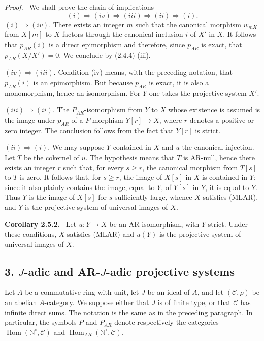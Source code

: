 \documentclass[11pt]{article}
\providecommand{\NN}{\mathbb{N}}
\newenvironment{statement}[1]{\par\medskip\noindent\textbf{#1.}\ }{\par\medskip}
\newenvironment{prooftext}[1][Proof]{\par\noindent\emph{#1.}\ }{\par\medskip}
\DeclareMathOperator{\Hom}{Hom}
\providecommand{\Hom}{\operatorname{Hom}}
\providecommand{\NN}{\mathbb N}
\providecommand{\cC}{\mathcal C}
\providecommand{\cC}{\mathcal C}
\providecommand{\Hom}{\operatorname{Hom}}
\begin{document}
\begin{prooftext}[Proof]
We shall prove the chain of implications
\[
(i)\Rightarrow(iv)\Rightarrow(iii)\Rightarrow(ii)\Rightarrow(i).
\]
$(i)\Rightarrow(iv)$. There exists an integer $m$ such that the canonical morphism $w_{mX}$ from $X[m]$ to $X$ factors through the canonical inclusion $i$ of $X'$ in $X$. It follows that $p_{AR}(i)$ is a direct epimorphism and therefore, since $p_{AR}$ is exact, that $p_{AR}(X/X')=0$. We conclude by (2.4.4) (iii).

$(iv)\Rightarrow(iii)$. Condition (iv) means, with the preceding notation, that $p_{AR}(i)$ is an epimorphism. But because $p_{AR}$ is exact, it is also a monomorphism, hence an isomorphism. For $Y$ one takes the projective system $X'$.

$(iii)\Rightarrow(ii)$. The $P_{AR}$-isomorphism from $Y$ to $X$ whose existence is assumed is the image under $p_{AR}$ of a $P$-morphism $Y[r]\to X$, where $r$ denotes a positive or zero integer. The conclusion follows from the fact that $Y[r]$ is strict.

$(ii)\Rightarrow(i)$. We may suppose $Y$ contained in $X$ and $u$ the canonical injection. Let $T$ be the cokernel of $u$. The hypothesis means that $T$ is AR-null, hence there exists an integer $r$ such that, for every $s\ge r$, the canonical morphism from $T[s]$ to $T$ is zero. It follows that, for $s\ge r$, the image of $X[s]$ in $X$ is contained in $Y$; since it also plainly contains the image, equal to $Y$, of $Y[s]$ in $Y$, it is equal to $Y$. Thus $Y$ is the image of $X[s]$ for $s$ sufficiently large, whence $X$ satisfies (MLAR), and $Y$ is the projective system of universal images of $X$.
\end{prooftext}

\begin{statement}{Corollary 2.5.2}
Let $u:Y\to X$ be an AR-isomorphism, with $Y$ strict. Under these conditions, $X$ satisfies (MLAR) and $u(Y)$ is the projective system of universal images of $X$.
\end{statement}

\subsection*{3. $J$-adic and AR-$J$-adic projective systems}
Let $A$ be a commutative ring with unit, let $J$ be an ideal of $A$, and let $(\cC,\rho)$ be an abelian $A$-category. We suppose either that $J$ is of finite type, or that $\cC$ has infinite direct sums. The notation is the same as in the preceding paragraph. In particular, the symbols $P$ and $P_{AR}$ denote respectively the categories $\Hom(\NN^\circ,\cC)$ and $\Hom_{AR}(\NN^\circ,\cC)$.
\end{document}
